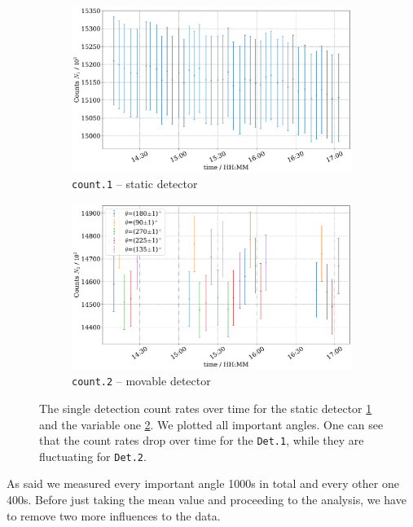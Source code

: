 \documentclass[11pt,a4paper,notitlepage]{scrartcl}
\begin{document}
\begin{figure}[htbp]
	\centering
	\begin{subfigure}{0.49\linewidth}
		\includegraphics[width=\linewidth]{figs/main/time_dependence_n1.pdf}
		\caption{\texttt{count.1} -- static detector}\label{fig:time_dependence_1}
	\end{subfigure}
	\begin{subfigure}{0.49\linewidth}
		\includegraphics[width=\linewidth]{figs/main/time_dependence_n2.pdf}
		\caption{\texttt{count.2} -- movable detector}\label{fig:time_dependence_2}
	\end{subfigure}
	\caption{The single detection count rates over time for the static detector \ref{fig:time_dependence_1} and the variable one \ref{fig:time_dependence_2}. We plotted all important angles. One can see that the count rates drop over time for the \texttt{Det.1}, while they are fluctuating for \texttt{Det.2}.}\label{fig:time_dependence}
\end{figure}

As said we measured every important angle 1000s in total and every other one 400s. Before just taking the mean value and proceeding to the analysis, we have to remove two more influences to the data.
\end{document}
